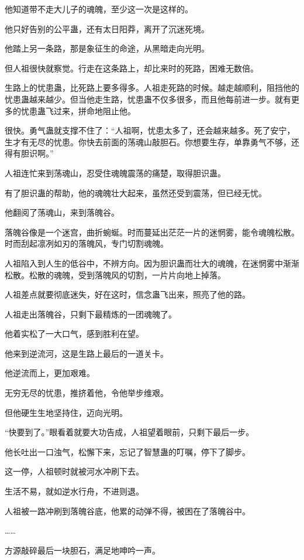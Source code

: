 \begin{this_body}
他知道带不走大儿子的魂魄，至少这一次是这样的。

他只好告别的公平蛊，还有太日阳莽，离开了沉迷死境。

他踏上另一条路，那是象征生的命途，从黑暗走向光明。

但人祖很快就察觉。行走在这条路上，却比来时的死路，困难无数倍。

生路上的忧患蛊，比死路上要多得多。人祖走死路的时候。越走越顺利，阻挡他的忧患蛊越来越少。但当他走生路，忧患蛊不仅多很多，而且他每前进一步。就有更多的忧患蛊飞过来，拼命地阻止他。

很快。勇气蛊就支撑不住了：“人祖啊，忧患太多了，还会越来越多。死了安宁，生才有无尽的忧患。你快去前面的荡魂山敲胆石。你想要生存，单靠勇气不够，还得有胆识啊。”

人祖连忙来到荡魂山，忍受住魂魄震荡的痛楚，取得胆识蛊。

有了胆识蛊的帮助，他的魂魄壮大起来，虽然还受到震荡，但已经无忧。

他翻阅了荡魂山，来到落魄谷。

落魄谷像是一个迷宫，曲折蜿蜒。时而蔓延出茫茫一片的迷惘雾，能令魂魄松散。时而刮起凛冽如刃的落魄风，专门切割魂魄。

人祖陷入到人生的低谷中，不辨方向。因为胆识蛊而壮大的魂魄，在迷惘雾中渐渐松散。松散的魂魄，受到落魄风的切割，一片片向地上掉落。

人祖差点就要彻底迷失，好在这时，信念蛊飞出来，照亮了他的路。

人祖走出落魄谷，只剩下最精炼的一团魂魄了。

他着实松了一大口气，感到胜利在望。

他来到逆流河，这是生路上最后的一道关卡。

他逆流而上，更加艰难。

无穷无尽的忧患，推挤着他，令他举步维艰。

但他硬生生地坚持住，迈向光明。

“快要到了。”眼看着就要大功告成，人祖望着眼前，只剩下最后一步。

他长吐出一口浊气，松懈下来，忘记了智慧蛊的叮嘱，停下了脚步。

这一停，人祖顿时就被河水冲刷下去。

生活不易，就如逆水行舟，不进则退。

人祖被一路冲刷到落魄谷底，他累的动弹不得，被困在了落魄谷中。

……

方源敲碎最后一块胆石，满足地呻吟一声。


\end{this_body}
